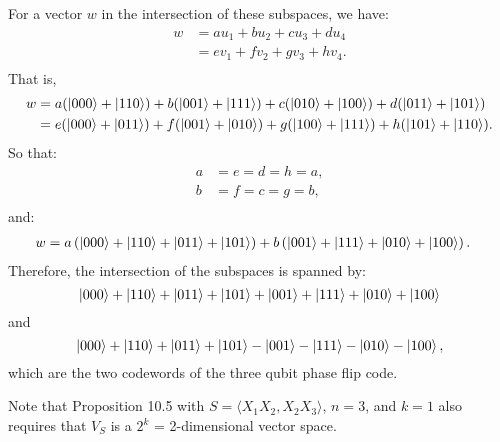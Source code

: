 \documentclass[12pt]{extarticle}
\begin{document}
For a vector $w$ in the intersection of these subspaces, we have:
\begin{align*}
w & = a u_1 + b u_2 + c u_3 + d u_4 \\
  & = e v_1 + f v_2 + g v_3 + h v_4. \\
\end{align*}
That is,
\begin{align*}
w & = a (\ket{000} + \ket{110}) + b (\ket{001} + \ket{111}) + c (\ket{010} + \ket{100}) + d (\ket{011} + \ket{101}) \\
  & = e (\ket{000} + \ket{011}) + f (\ket{001} + \ket{010}) + g (\ket{100} + \ket{111}) + h (\ket{101} + \ket{110}). \\
\end{align*}
So that:
\begin{align*}
a & = e = d = h = a, \\
b & = f = c = g = b, \\
\end{align*}
and:
\begin{align*}
w & = a \left( \ket{000} + \ket{110} + \ket{011} + \ket{101} \right) + b \left( \ket{001} + \ket{111} + \ket{010} + \ket{100} \right).
\end{align*}
Therefore, the intersection of the subspaces is spanned by:
\[
\ket{000} + \ket{110} + \ket{011} + \ket{101} + \ket{001} + \ket{111} + \ket{010} + \ket{100}
\]
and
\[
\ket{000} + \ket{110} + \ket{011} + \ket{101} - \ket{001} - \ket{111} - \ket{010} - \ket{100},
\]
which are the two codewords of the three qubit phase flip code.

Note that Proposition 10.5 with $S=\langle X_1X_2, X_2X_3 \rangle$, $n=3$, and $k=1$ also
requires that $V_S$ is a $2^k$ = 2-dimensional vector space.
\end{document}
